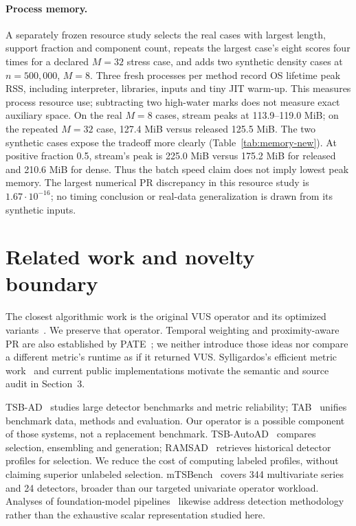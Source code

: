 \paragraph{Process memory.}
A separately frozen resource study selects the real cases with largest length,
support fraction and component count, repeats the largest case's eight scores
four times for a declared $M=32$ stress case, and adds two synthetic density
cases at $n=500{,}000$, $M=8$. Three fresh processes per method record OS
lifetime peak RSS, including interpreter, libraries, inputs and tiny JIT warm-up.
This measures process resource use; subtracting two high-water marks does not
measure exact auxiliary space. On the real $M=8$ cases, stream peaks at
113.9--119.0 MiB; on the repeated $M=32$ case, 127.4 MiB versus released
125.5 MiB. The two synthetic cases expose the tradeoff more clearly
(Table~\ref{tab:memory-new}). At positive fraction 0.5, stream's peak is
225.0 MiB versus 175.2 MiB for released and 210.6 MiB for dense. Thus the
batch speed claim does not imply lowest peak memory. The largest numerical
PR discrepancy in this resource study is $1.67\cdot10^{-16}$; no timing
conclusion or real-data generalization is drawn from its synthetic inputs.


\section{Related work and novelty boundary}
The closest algorithmic work is the original VUS operator and its optimized
variants~\cite{paparrizos2022,boniol2025}. We preserve that operator. Temporal
weighting and proximity-aware PR are also established by
PATE~\cite{ghorbani2024pateproximityawaretimeseries}; we neither introduce those
ideas nor compare a different metric's runtime as if it returned VUS.
Sylligardos's efficient metric work~\cite{sylligardos2025} and current public
implementations motivate the semantic and source audit in Section~3.

TSB-AD~\cite{tsbad} studies large detector benchmarks and metric reliability;
TAB~\cite{qiu2025tabunifiedbenchmarkingtime} unifies benchmark data, methods and
evaluation. Our operator is a possible component of those systems, not a
replacement benchmark. TSB-AutoAD~\cite{liu2025autoad} compares selection,
ensembling and generation; RAMSAD~\cite{panourgias2026retrievaltrainingsimilaritysearchbased}
retrieves historical detector profiles for selection. We reduce the cost of
computing labeled profiles, without claiming superior unlabeled selection.
mTSBench~\cite{mtsbench} covers 344 multivariate series and 24 detectors, broader
than our targeted univariate operator workload. Analyses of foundation-model
pipelines~\cite{zhu2026} likewise address detection methodology rather than the
exhaustive scalar representation studied here.

